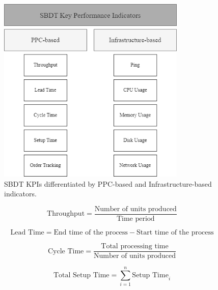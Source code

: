 \begin{figure}[htbp]
  \centering
  \includegraphics[width=0.8\textwidth]{figures/kpi.png}
  \caption{SBDT KPIs differentiated by PPC-based and Infrastructure-based indicators.}
  \label{fig:kpis}
\end{figure}

\begin{equation}
  \text{Throughput} = \frac{\text{Number of units produced}}{\text{Time period}}
  \label{eq:throughput}
\end{equation}

\begin{equation}
  \text{Lead Time} = \text{End time of the process} - \text{Start time of the process}
  \label{eq:lead_time}
\end{equation}

\begin{equation}
  \text{Cycle Time} = \frac{\text{Total processing time}}{\text{Number of units produced}}
  \label{eq:cycle_time}
\end{equation}

\begin{equation}
  \text{Total Setup Time} = \sum_{i=1}^{n} \text{Setup Time}_i
  \label{eq:setup_time}
\end{equation}

